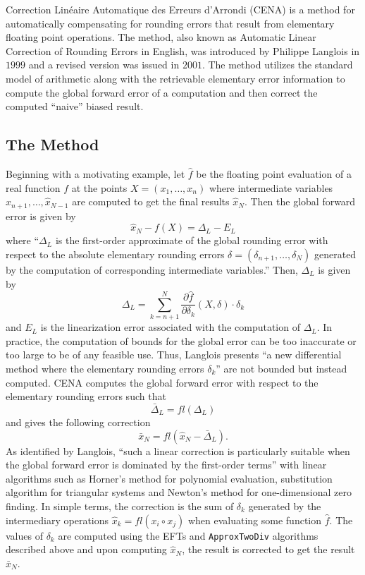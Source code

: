 \documentclass{standalone}
\begin{document}
	Correction Linéaire Automatique des Erreurs d'Arrondi (CENA) is a method for automatically compensating for rounding errors that result from elementary floating point operations. The method, also known as Automatic Linear Correction of Rounding Errors in English, was introduced by Philippe Langlois in $1999$ and a revised version was issued in $2001$. \cite{langlois2001automatic} The method utilizes the standard model of arithmetic along with the retrievable elementary error information to compute the global forward error of a computation and then correct the computed ``naive'' biased result.
	\subsection{The Method}
	Beginning with a motivating example, let $\hat{f}$ be the floating point evaluation of a real function $f$ at the points $X=(x_{1},\dots,x_{n})$ where intermediate variables $\hat{x}_{n+1},\dots,\hat{x}_{N-1}$ are computed to get the final results $\hat{x}_{N}$. \cite{langlois2001automatic} Then the global forward error is given by$$\hat{x}_{N}-f(X)=\Delta_{L}-E_{L}$$where ``$\Delta_{L}$ is the first-order approximate of the global rounding error with respect to the absolute elementary rounding errors $\delta=(\delta_{n+1},\dots,\delta_{N})$ generated by the computation of corresponding intermediate variables.'' \cite{langlois2001automatic} Then, $\Delta_{L}$ is given by$$\Delta_{L}=\sum_{k=n+1}^{N}\frac{\partial\hat{f}}{\partial\delta_{k}}(X,\delta)\cdot\delta_{k}$$and $E_{L}$ is the linearization error associated with the computation of $\Delta_{L}$. In practice, the computation of bounds for the global error can be too inaccurate or too large to be of any feasible use. Thus, Langlois presents ``a new differential method where the elementary rounding errors $\delta_{k}$'' are not bounded but instead computed. \cite{langlois2001automatic} CENA computes the global forward error with respect to the elementary rounding errors such that$$\bar{\Delta}_{L}=fl(\Delta_{L})$$and gives the following correction$$\bar{x}_{N}=fl(\hat{x}_{N}-\bar{\Delta}_{L}).$$As identified by Langlois, ``such a linear correction is particularly suitable when the global forward error is dominated by the first-order terms'' with linear algorithms such as Horner's method for polynomial evaluation, substitution algorithm for triangular systems and Newton's method for one-dimensional zero finding. In simple terms, the correction is the sum of $\delta_{k}$ generated by the intermediary operations $\hat{x}_{k}=fl(x_{i}\circ x_{j})$ when evaluating some function $\hat{f}$. The values of $\delta_{k}$ are computed using the EFTs and \texttt{ApproxTwoDiv} algorithms described above and upon computing $\hat{x}_{N}$, the result is corrected to get the result $\bar{x}_{N}$.
\end{document}
